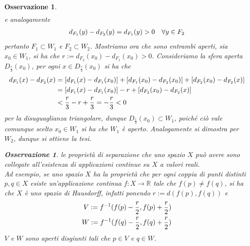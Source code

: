 \documentclass[oneside, 11pt]{amsbook}
\makeatletter
\newcommand{\0}{{(0)}}
\newcommand{\3}{{(3)}}
\theoremstyle{colonplain}
\theoremstyle{colondefinition}
\theoremstyle{colonremark}
\newtheorem{rmk}[thm]{Osservazione}
\numberwithin{equation}{chapter}
\renewcommand{\proofname}{Dimostrazione}
\renewenvironment{proof}[1][\proofname]{\par
  \pushQED{\end{proof}}%
  \normalfont \topsep6\p@\@plus6\p@\relax
  \trivlist
  \item[\hskip\labelsep\bfseries #1:]\ignorespaces
}{%
  \popQED\endtrivlist\@endpefalse
}
\makeatother
\begin{document}
\begin{rmk}
\begin{proof}
\begin{align}
\end{align}
e analogamente
\begin{align}
    d_{F_1}(y) - d_{F_2}(y) = d_{F_1}(y) > 0 \quad \forall y \in F_2 \notag
\end{align}
pertanto $F_1 \subset W_1$ e $F_2 \subset W_2$. Mostriamo ora che sono entrambi aperti, sia $x_0 \in W_1$, si ha che $r := d_{F_2}(x_0) - d_{F_1}(x_0) > 0$. Consideriamo la sfera aperta $D_{\frac{r}{3}}(x_0)$, per ogni $x \in D_{\frac{r}{3}}(x_0)$ si ha che
\begin{align}
    d_{F_1}(x) - d_{F_2}(x) &= [d_{F_1}(x) - d_{F_1}(x_0)] + [d_{F_1}(x_0) - d_{F_2}(x_0)] + [d_{F_2}(x_0) - d_{F_2}(x)] \notag \\
    &= [d_{F_1}(x) - d_{F_1}(x_0)] - r + [d_{F_2}(x_0) - d_{F_2}(x)] \notag \\
    &< \frac{r}{3} - r + \frac{r}{3} = -\frac{r}{3} < 0 \notag
\end{align}
per la disuguaglianza triangolare, dunque $D_{\frac{r}{3}}(x_0) \subset W_1$, poiché ciò vale comunque scelto $x_0 \in W_1$ si ha che $W_1$ è aperto. Analogamente si dimostra per $W_2$, dunque si ottiene la tesi.
\end{proof}
\begin{rmk}
le proprietà di separazione che uno spazio $X$ può avere sono collegate all'esistenza di applicazioni continue su $X$ a valori reali. \\
Ad esempio, se uno spazio $X$ ha la proprietà che per ogni coppia di punti distinti $p, q \in X$ esiste un'applicazione continua $f : X \longrightarrow \mathbb{R}$ tale che $f(p) \neq f(q)$, si ha che $X$ è uno spazio di Hausdorff, infatti ponendo $r := d(f(p), f(q))$ e
\begin{align}
    V := f^{-1}(f(p) - \frac{r}{2}, f(p) + \frac{r}{2}) \notag \\
    W := f^{-1}(f(q) - \frac{r}{2}, f(q) + \frac{r}{2}) \notag
\end{align}
$V$ e $W$ sono aperti disgiunti tali che $p \in V$ e $q \in W$.
\end{rmk}


\end{rmk}
\end{document}
